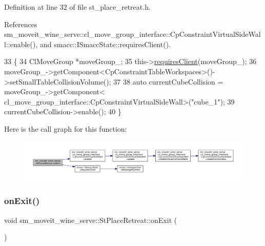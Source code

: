 Definition at line 32 of file st\+\_\+place\+\_\+retreat.\+h.



References sm\+\_\+moveit\+\_\+wine\+\_\+serve\+::cl\+\_\+move\+\_\+group\+\_\+interface\+::\+Cp\+Constraint\+Virtual\+Side\+Wall\+::enable(), and smacc\+::\+I\+Smacc\+State\+::requires\+Client().


\begin{DoxyCode}
33         \{
34             ClMoveGroup *moveGroup\_;
35             this->\hyperlink{classsmacc_1_1ISmaccState_a7f95c9f0a6ea2d6f18d1aec0519de4ac}{requiresClient}(moveGroup\_);
36             moveGroup\_->getComponent<CpConstraintTableWorkspaces>()->setSmallTableCollisionVolume();
37 
38             \textcolor{keyword}{auto} currentCubeCollision = moveGroup\_->getComponent<
      cl\_move\_group\_interface::CpConstraintVirtualSideWall>(\textcolor{stringliteral}{"cube\_1"});
39             currentCubeCollision->enable();
40         \}
\end{DoxyCode}
Here is the call graph for this function\+:
\nopagebreak
\begin{figure}[H]
\begin{center}
\leavevmode
\includegraphics[width=350pt]{structsm__moveit__wine__serve_1_1StPlaceRetreat_a5ad3c6c22499c5853f73dcb1d9009bf2_cgraph}
\end{center}
\end{figure}
\mbox{\label{structsm__moveit__wine__serve_1_1StPlaceRetreat_aece538e80864c13b6231f6e03425e454}} 
\subsubsection{\texorpdfstring{on\+Exit()}{onExit()}\hspace{0.1cm}{\footnotesize\ttfamily [2/2]}}
{\footnotesize\ttfamily void sm\+\_\+moveit\+\_\+wine\+\_\+serve\+::\+St\+Place\+Retreat\+::on\+Exit (\begin{DoxyParamCaption}\item[{\hyperlink{structsmacc_1_1default__transition__tags_1_1ABORT}{A\+B\+O\+RT}}]{ }\end{DoxyParamCaption})\hspace{0.3cm}{\ttfamily [inline]}}



